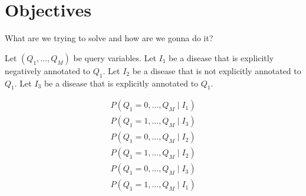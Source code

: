\section{Objectives}
\label{sec:obj}

What are we trying to solve and how are we gonna do it?


Let $(Q_1, ..., Q_M)$ be query variables.
Let $I_1$ be a disease that is explicitly negatively annotated to $Q_1$.
Let $I_2$ be a disease that is not explicitly annotated to $Q_1$.
Let $I_3$ be a disease that is explicitly annotated to $Q_1$.

\begin{align*}
    P(Q_1 = 0, \hdots, Q_M \mid I_1) \\
    P(Q_1 = 1, \hdots, Q_M \mid I_3) \\
    P(Q_1 = 0, \hdots, Q_M \mid I_2) \\
    P(Q_1 = 1, \hdots, Q_M \mid I_2) \\
    P(Q_1 = 0, \hdots, Q_M \mid I_3) \\
    P(Q_1 = 1, \hdots, Q_M \mid I_1) 
\end{align*}
      